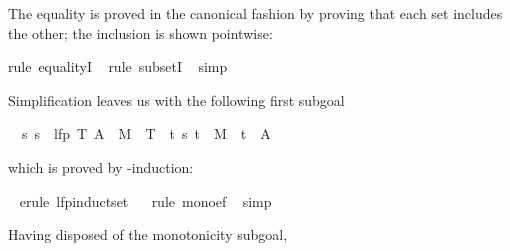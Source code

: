 \begin{isabellebody}
%
\isatagproof
%
\begin{isamarkuptxt}%
\noindent
The equality is proved in the canonical fashion by proving that each set
includes the other; the inclusion is shown pointwise:%
\end{isamarkuptxt}%
\isamarkuptrue%
\isamarkupfalse%
{}rule\ equalityI{}\isanewline
\ \isamarkupfalse%
{}rule\ subsetI{}\isanewline
\ \isamarkupfalse%
{}simp{}%
\begin{isamarkuptxt}%
\noindent
Simplification leaves us with the following first subgoal
\begin{isabelle}%
\ {}{}\ {}s{}\ s\ {}\ lfp\ {}{}T{}\ A\ {}\ M{}\ {}{}\ T{}\ {}\ {}t{}\ {}s{}\ t{}\ {}\ M\ {}\ t\ {}\ A%
\end{isabelle}
which is proved by -induction:%
\end{isamarkuptxt}%
\isamarkuptrue%
\ \isamarkupfalse%
{}erule\ lfp{}induct{}set{}\isanewline
\ \ \isamarkupfalse%
{}rule\ mono{}ef{}\isanewline
\ \isamarkupfalse%
{}simp{}%
\begin{isamarkuptxt}%
\noindent
Having disposed of the monotonicity subgoal,

\end{isamarkuptxt}
\end{isabellebody}
